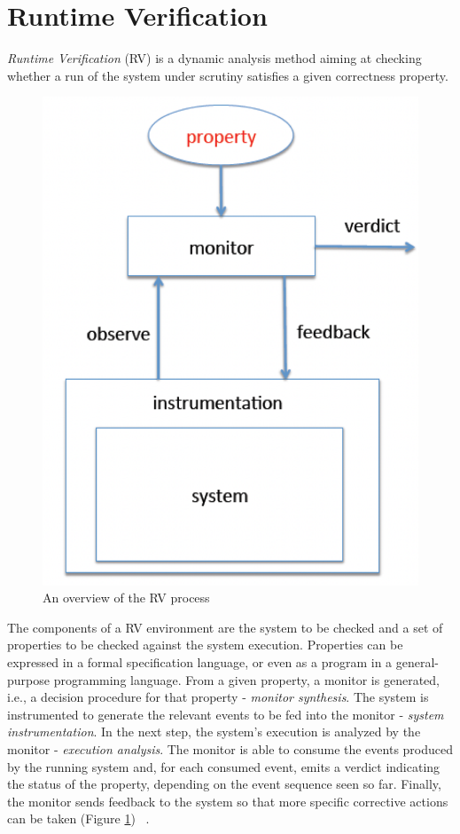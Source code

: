 	\section{Runtime Verification}
	\textit{Runtime Verification} (RV) is a dynamic analysis method aiming at checking whether a run of the system under scrutiny satisfies a given correctness property.

  \begin{figure}
	\centering
	\includegraphics [scale=0.4]{Images/rv.png}
	\caption{An overview of the RV process}
	\label{rv}
\end{figure}

 The components of a RV environment are the system to be checked and a set of properties to be checked against the system execution. Properties can be expressed in a formal specification language, or even as a program in a general-purpose programming language. From a given property, a monitor is generated, i.e., a decision procedure for that property - \textit{monitor synthesis}. The system is instrumented to generate the relevant events to be fed into the monitor - \textit{system instrumentation}. In the next step, the system's execution is analyzed by the monitor - \textit{execution analysis}. The monitor is able to consume the events produced by the running system and, for each consumed event, emits a verdict indicating the status of the property, depending on the event sequence seen so far. Finally, the monitor sends feedback to the system so that more specific corrective actions can be taken (Figure \ref{rv}) ~\cite{rvart}.
 
